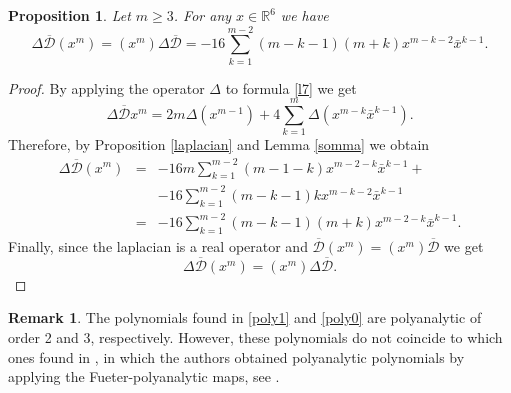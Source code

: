 \documentclass[reqno,11pt]{amsart}
\numberwithin{equation}{section}
\newtheorem{proposition}[theorem]{Proposition}
\theoremstyle{definition}
\newtheorem{remark}[theorem]{{\bf Remark}}
\begin{document}
\begin{proposition}
\label{antidirac}
Let $ m \geq 3$. For any $x \in \mathbb{R}^6$ we have
\begin{equation}
\label{poly0}
\Delta \mathcal{\overline{D}}(x^m)=(x^m)\Delta \mathcal{\overline{D}}=-16 \sum_{k=1}^{m-2} (m-k-1)(m+k)x^{m-k-2} \bar{x}^{k-1}.
\end{equation}
\end{proposition}
\begin{proof}
By applying the operator $\Delta$ to formula \eqref{l7} we get
$$ \Delta \mathcal{\overline{D}}x^m=2m \Delta(x^{m-1})+4 \sum_{k=1}^m \Delta(x^{m-k} \bar{x}^{k-1}).$$
Therefore, by Proposition \ref{laplacian} and Lemma \ref{somma} we obtain
\begin{eqnarray*}
\Delta \mathcal{\overline{D}}(x^m)&=& -16m \sum_{k=1}^{m-2} (m-1-k)x^{m-2-k} \bar{x}^{k-1}+\\
&&-16 \sum_{k=1}^{m-2}(m-k-1)k x^{m-k-2} \bar{x}^{k-1}\\
&=&-16 \sum_{k=1}^{m-2}(m-k-1)(m+k)x^{m-2-k} \bar{x}^{k-1}.
\end{eqnarray*}
Finally, since the laplacian is a real operator and $ \mathcal{\overline{D}}(x^m)= (x^m)\mathcal{\overline{D}}$ we get
$$ \Delta \mathcal{\overline{D}}(x^m)=(x^m)\Delta \mathcal{\overline{D}}.$$
\end{proof}
\begin{remark}
The polynomials found in \eqref{poly1} and \eqref{poly0} are polyanalytic of order 2 and 3, respectively.  However, these polynomials do not coincide to which ones found in \cite{DMD3}, in which the authors obtained polyanalytic polynomials by applying the Fueter-polyanalytic maps, see \cite{ADS}.
\end{remark}
\end{document}
